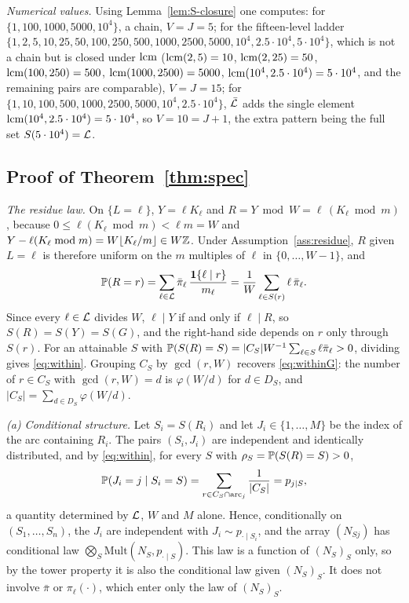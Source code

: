 \emph{Numerical values.} Using Lemma~\ref{lem:S-closure} one computes: for $\{1,100,1000,5000,10^4\}$, a chain, $V=J=5$; for the fifteen-level ladder $\{1,\allowbreak 2,\allowbreak 5,\allowbreak 10,\allowbreak 25,\allowbreak 50,\allowbreak 100,\allowbreak 250,\allowbreak 500,\allowbreak 1000,\allowbreak 2500,\allowbreak 5000,\allowbreak 10^4,\allowbreak 2.5\cdot10^4,\allowbreak 5\cdot10^4\}$, which is not a chain but is closed under $\operatorname{lcm}$ ($\operatorname{lcm}(2,5)=10$, $\operatorname{lcm}(2,25)=50$, $\operatorname{lcm}(100,250)=500$, $\operatorname{lcm}(1000,2500)=5000$, $\operatorname{lcm}(10^4,2.5\cdot10^4)=5\cdot10^4$, and the remaining pairs are comparable), $V=J=15$; for $\{1,10,100,500,1000,2500,5000,10^4,2.5\cdot10^4\}$, $\bar{\mathcal{L}}$ adds the single element $\operatorname{lcm}(10^4,2.5\cdot10^4)=5\cdot10^4$, so $V=10=J+1$, the extra pattern being the full set $S(5\cdot10^4)=\mathcal{L}$.

\subsection{Proof of Theorem~\ref{thm:spec}}

\emph{The residue law.} On $\{L=\ell\}$, $Y=\ell K_\ell$ and $R=Y\bmod W=\ell\,(K_\ell\bmod m)$, because $0\le\ell(K_\ell\bmod m)<\ell m=W$ and $Y-\ell(K_\ell\bmod m)=W\lfloor K_\ell/m\rfloor\in W\mathbb{Z}$. Under Assumption~\ref{ass:residue}, $R$ given $L=\ell$ is therefore uniform on the $m$ multiples of $\ell$ in $\{0,\dots,W-1\}$, and
\[
\mathbb{P}(R=r)=\sum_{\ell\in\mathcal{L}}\bar\pi_\ell\,\frac{\mathbf 1\{\ell\mid r\}}{m_\ell}=\frac1W\sum_{\ell\in S(r)}\ell\,\bar\pi_\ell .
\]
Since every $\ell\in\mathcal{L}$ divides $W$, $\ell\mid Y$ if and only if $\ell\mid R$, so $S(R)=S(Y)=S(G)$, and the right-hand side depends on $r$ only through $S(r)$. For an attainable $S$ with $\mathbb{P}(S(R)=S)=|C_S|W^{-1}\sum_{\ell\in S}\ell\bar\pi_\ell>0$, dividing gives \eqref{eq:within}. Grouping $C_S$ by $\gcd(r,W)$ recovers \eqref{eq:withinG}: the number of $r\in C_S$ with $\gcd(r,W)=d$ is $\varphi(W/d)$ for $d\in D_S$, and $|C_S|=\sum_{d\in D_S}\varphi(W/d)$.

\emph{(a) Conditional structure.} Let $S_i=S(R_i)$ and let $J_i\in\{1,\dots,M\}$ be the index of the arc containing $R_i$. The pairs $(S_i,J_i)$ are independent and identically distributed, and by \eqref{eq:within}, for every $S$ with $\rho_S=\mathbb{P}(S(R)=S)>0$,
\[
\mathbb{P}(J_i=j\mid S_i=S)=\sum_{r\in C_S\cap\mathrm{arc}_j}\frac1{|C_S|}=p_{j\mid S},
\]
a quantity determined by $\mathcal{L}$, $W$ and $M$ alone. Hence, conditionally on $(S_1,\dots,S_n)$, the $J_i$ are independent with $J_i\sim p_{\cdot\mid S_i}$, and the array $(N_{Sj})$ has conditional law $\bigotimes_S\mathrm{Mult}(N_S,p_{\cdot\mid S})$. This law is a function of $(N_S)_S$ only, so by the tower property it is also the conditional law given $(N_S)_S$. It does not involve $\bar\pi$ or $\pi_\ell(\cdot)$, which enter only the law of $(N_S)_S$.


